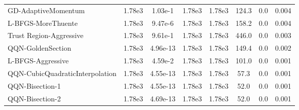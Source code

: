 \documentclass{article}
\begin{document}
\begin{table}[htbp]
{\begin{tabular}{p{2.5cm}*{7}{c}}
GD-AdaptiveMomentum & 1.78e3 & 1.03e-1 & 1.78e3 & 1.78e3 & 124.3 & 0.0 & 0.004 \\
L-BFGS-MoreThuente & 1.78e3 & 9.47e-6 & 1.78e3 & 1.78e3 & 158.2 & 0.0 & 0.004 \\
Trust Region-Aggressive & 1.78e3 & 9.61e-1 & 1.78e3 & 1.78e3 & 446.0 & 0.0 & 0.003 \\
QQN-GoldenSection & 1.78e3 & 4.96e-13 & 1.78e3 & 1.78e3 & 149.4 & 0.0 & 0.002 \\
L-BFGS-Aggressive & 1.78e3 & 4.59e-2 & 1.78e3 & 1.78e3 & 101.0 & 0.0 & 0.001 \\
QQN-CubicQuadraticInterpolation & 1.78e3 & 4.55e-13 & 1.78e3 & 1.78e3 & 57.3 & 0.0 & 0.001 \\
QQN-Bisection-1 & 1.78e3 & 4.55e-13 & 1.78e3 & 1.78e3 & 52.0 & 0.0 & 0.001 \\
QQN-Bisection-2 & 1.78e3 & 4.69e-13 & 1.78e3 & 1.78e3 & 52.0 & 0.0 & 0.001 \\
\bottomrule
\end{tabular}
}
\end{table}
\end{document}
